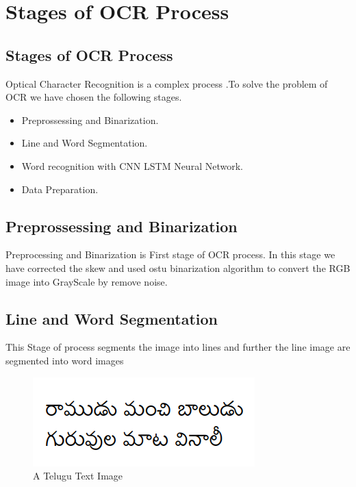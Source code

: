 
\chapter{Stages of OCR Process} %

\label{Chapter2} %


\section{Stages of OCR Process }
Optical Character Recognition is a complex process .To solve the problem of OCR we have chosen the following stages.
\begin{itemize}
  
  \item Preprossessing and Binarization.
  \item Line and Word Segmentation.
  \item Word recognition with CNN LSTM Neural Network.
  \item Data Preparation.
\end{itemize}


\section{Preprossessing and Binarization}
Preprocessing and Binarization is First stage of OCR process. In this stage we have corrected the skew and used ostu binarization algorithm to convert the RGB image into GrayScale by remove noise.

\section{Line and Word Segmentation}
This Stage of process segments the image into lines and further the line image are segmented into word images
\begin{figure}[h]
\includegraphics{Figures/my_tel_img.png}
\caption{A Telugu Text Image}
\end{figure}


